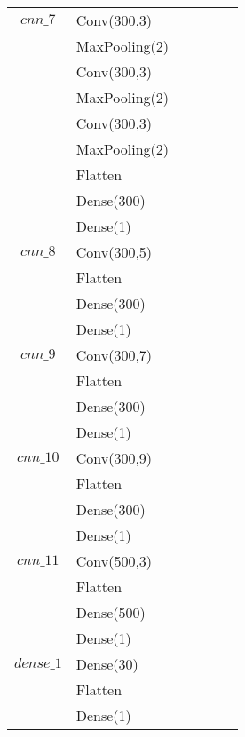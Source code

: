 \begin{longtable}{| c | m{0.58\linewidth} | r | m{0.1\linewidth} |}
    $cnn\_7$    & Conv(300,3)               \\
                & MaxPooling(2)             \\
                & Conv(300,3)               \\
                & MaxPooling(2)             \\
                & Conv(300,3)               \\
                & MaxPooling(2)             \\
                & Flatten                   \\
                & Dense(300)                \\
                & Dense(1)                  \\ \hline
    $cnn\_8$    & Conv(300,5)               \\
                & Flatten                   \\
                & Dense(300)                \\
                & Dense(1)                  \\ \hline
    $cnn\_9$    & Conv(300,7)               \\
                & Flatten                   \\
                & Dense(300)                \\
                & Dense(1)                  \\ \hline
    $cnn\_10$   & Conv(300,9)               \\
                & Flatten                   \\
                & Dense(300)                \\
                & Dense(1)                  \\ \hline


    $cnn\_11$   & Conv(500,3)               \\
                & Flatten                   \\
                & Dense(500)                \\
                & Dense(1)                  \\ \hline


    $dense\_1$  & Dense(30)                 \\
                & Flatten                   \\
                & Dense(1)                  \\ \hline


\end{longtable}
